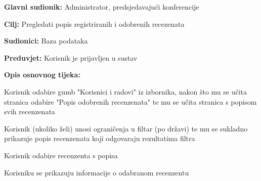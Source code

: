 					\noindent {}
					\begin{packed_item}
	
						\item \textbf{Glavni sudionik: } Administrator, predsjedavajući konferencije
						\item  \textbf{Cilj:} Pregledati popis registriranih i odobrenih recezenata
						\item  \textbf{Sudionici:} Baza podataka
						\item  \textbf{Preduvjet:} Korisnik je prijavljen u sustav
						\item  \textbf{Opis osnovnog tijeka:}
						
						\item[] \begin{packed_enum}

							\item Korisnik odabire gumb "Korisnici i radovi" iz izbornika, nakon što mu se učita stranica odabire "Popis odobrenih recenzenata" te mu se učita stranica s popisom svih recenzenata
							\item Korisnik (ukoliko želi) unosi ograničenja u filtar (po državi) te mu se sukladno prikazuje popis recenzenata koji odgovaraju rezultatima filtra
							\item Korisnik odabire recenzenta s popisa
							\item Korisniku se prikazuju informacije o odabranom recenzentu

					
						\end{packed_enum}
			
					\end{packed_item}

